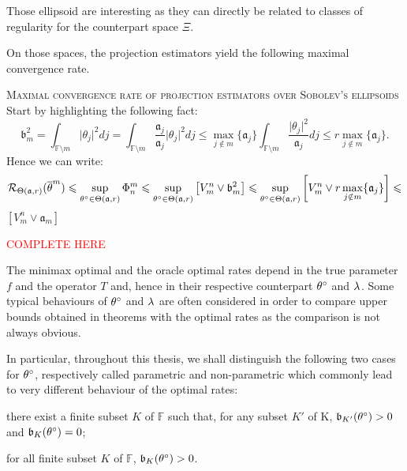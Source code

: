 \begin{Liste}[]
Those ellipsoid are interesting as they can directly be related to classes of regularity for the counterpart space $\Xi$.

On those spaces, the projection estimators yield the following maximal convergence rate.

\begin{de}{\textsc{Maximal convergence rate of projection estimators over Sobolev's ellipsoids} \\}\label{DE_INTRO_FREQ_DECISION_MINIMAXOPT_OPTPROJ}
Start by highlighting the following fact:
\[\mathfrak{b}_{m}^{2} = \int_{\mathds{F} \setminus m} \vert \theta_{j} \vert^{2} dj = \int_{\mathds{F} \setminus m} \frac{\mathfrak{a}_{j}}{\mathfrak{a}_{j}}\vert \theta_{j} \vert^{2} dj \leq \max\limits_{j \notin m}\{\mathfrak{a}_{j}\}\int_{\mathds{F} \setminus m} \frac{\vert \theta_{j} \vert^{2}}{\mathfrak{a}_{j}} dj \leq r \max\limits_{j \notin m}\{\mathfrak{a}_{j}\}.\]
Hence we can write:
\[\mathcal{R}_{\Theta(\mathfrak{a}, r)}(\overline{\theta}^{m}) \leq \sup\limits_{\fxdf \in \Theta(\mathfrak{a}, r)} \Phi_{n}^{m} \leq \sup\limits_{\fxdf \in \Theta(\mathfrak{a}, r)} \left[V_{m}^{n} \vee \mathfrak{b}_{m}^{2} \right] \leq  \sup\limits_{\fxdf \in \Theta(\mathfrak{a}, r)} \left[V_{m}^{n} \vee r \max\limits_{j \notin m}\{\mathfrak{a}_{j}\} \right] \leq \]
$\left[ V_{m}^{n} \vee \mathfrak{a}_{m} \right]$
\end{de}

\textcolor{red}{COMPLETE HERE}
\end{Liste}


The minimax optimal and the oracle optimal rates depend in the true parameter $f$ and the operator $T$ and, hence in their respective counterpart $\fxdf$ and $\fedf$.
Some typical behaviours of $\fxdf$ and $\fedf$ are often considered in order to compare upper bounds obtained in theorems with the optimal rates as the comparison is not always obvious.

In particular, throughout this thesis, we shall distinguish the following two cases for $\fxdf$, respectively called parametric and non-parametric which commonly lead to very different behaviour of the optimal rates:
\begin{Liste}[]
\item[\mylabel{oo:xdf:p}{\dgrau\bfseries{(p)}}] there exist a finite subset $K$ of $\mathds{F}$ such that, for any subset $K'$ of K, $\bias[K'](\fxdf) > 0$ and $\bias[K](\fxdf) = 0$;
\item[\mylabel{oo:xdf:np}{\dgrau\bfseries{(np)}}] for all finite subset $K$ of $\mathds{F}$, $\bias[K](\fxdf)>0$.
\end{Liste}

